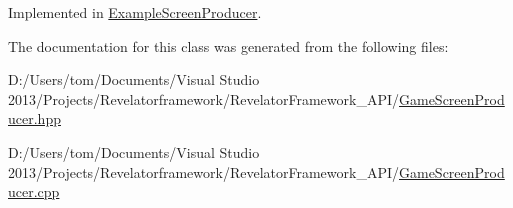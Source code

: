 Implemented in \hyperlink{class_example_screen_producer_a3c1e2f971c209bc027201a563b0c67c8}{Example\-Screen\-Producer}.



The documentation for this class was generated from the following files\-:\begin{DoxyCompactItemize}
\item 
D\-:/\-Users/tom/\-Documents/\-Visual Studio 2013/\-Projects/\-Revelatorframework/\-Revelator\-Framework\-\_\-\-A\-P\-I/\hyperlink{_game_screen_producer_8hpp}{Game\-Screen\-Producer.\-hpp}\item 
D\-:/\-Users/tom/\-Documents/\-Visual Studio 2013/\-Projects/\-Revelatorframework/\-Revelator\-Framework\-\_\-\-A\-P\-I/\hyperlink{_game_screen_producer_8cpp}{Game\-Screen\-Producer.\-cpp}\end{DoxyCompactItemize}
